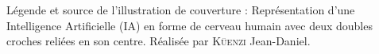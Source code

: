 \thispagestyle{empty}
\vspace*{500pt} %
Légende et source de l'illustration de couverture : Représentation d'une Intelligence Artificielle (IA) en forme de cerveau humain avec deux doubles croches reliées en son centre. Réalisée par \textsc{Küenzi} Jean-Daniel.